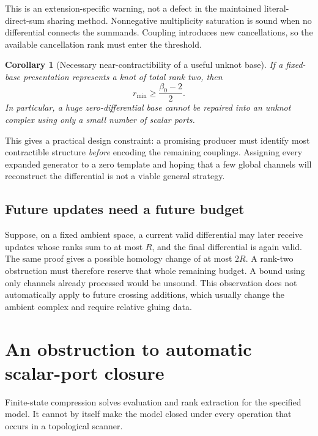 \documentclass[11pt,letterpaper]{article}
\newtheorem{corollary}[theorem]{Corollary}
\theoremstyle{definition}
\theoremstyle{remark}
\numberwithin{equation}{section}
\begin{document}
This is an extension-specific warning, not a defect in the maintained
literal-direct-sum sharing method. Nonnegative multiplicity saturation
is sound when no differential connects the summands. Coupling introduces
new cancellations, so the available cancellation rank must enter the
threshold.

\begin{corollary}[Necessary near-contractibility of a useful unknot base]
\label{cor:necessary}
If a fixed-base presentation represents a knot of total rank two, then
\[
 r_{\min}\ge \frac{\beta_0-2}{2}.
\]
In particular, a huge zero-differential base cannot be repaired into an
unknot complex using only a small number of scalar ports.
\end{corollary}

This gives a practical design constraint: a promising producer must
identify most contractible structure \emph{before} encoding the remaining
couplings. Assigning every expanded generator to a zero template and
hoping that a few global channels will reconstruct the differential is
not a viable general strategy.

\subsection{Future updates need a future budget}
Suppose, on a fixed ambient space, a current valid differential may later
receive updates whose ranks sum to at most $R$, and the final differential
is again valid. The same proof gives a possible homology change of at most
$2R$. A rank-two obstruction must therefore reserve that whole remaining
budget. A bound using only channels already processed would be unsound.
This observation does not automatically apply to future crossing additions,
which usually change the ambient complex and require relative gluing data.

\section{An obstruction to automatic scalar-port closure}
\label{sec:amplification}

Finite-state compression solves evaluation and rank extraction for the
specified model. It cannot by itself make the model closed under every
operation that occurs in a topological scanner.
\end{document}
